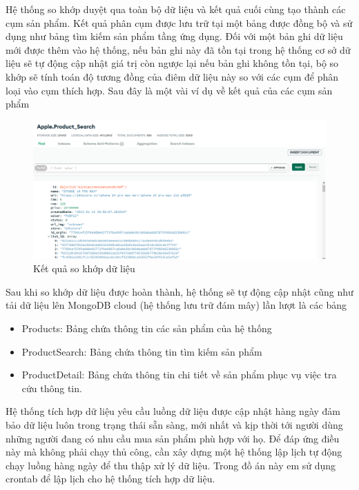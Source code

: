 \documentclass[../DoAn.tex]{subfiles}
\begin{document}
Hệ thống so khớp duyệt qua toàn bộ dữ liệu và kết quả cuối cùng tạo thành các cụm sản phẩm. Kết quả phân cụm được lưu trữ tại một bảng được đồng bộ và sử dụng như bảng tìm kiếm sản phẩm tầng ứng dụng. Đối với một bản ghi dữ liệu mới được thêm vào hệ thống, nếu bản ghi này đã tồn tại trong hệ thống cơ sở dữ liệu sẽ tự động cập nhật giá trị còn ngược lại nếu bản ghi không tồn tại, bộ so khớp sẽ tính toán độ tương đồng của điêm dữ liệu này so với các cụm để phân loại vào cụm thích hợp. Sau đây là một vài ví dụ về kết quả của các cụm sản phẩm

 \begin{figure}[H]
    \centering
    \includegraphics[scale=0.5]{Hinhve/data_matching_res.png}
    \caption{Kết quả so khớp dữ liệu}
    \label{fig:my_label2}
\end{figure}

 Sau khi so khớp dữ liệu được hoàn thành, hệ thống sẽ tự động cập nhật cũng như tải dữ liệu lên MongoDB cloud (hệ thống lưu trữ đám mây) lần lượt là các bảng 
 \begin{itemize}
     \item Products: Bảng chứa thông tin các sản phẩm của hệ thống
     \item ProductSearch: Bảng chứa thông tin tìm kiếm sản phẩm
     \item ProductDetail: Bảng chứa thông tin chi tiết về sản phẩm phục vụ việc tra cứu thông tin.
 \end{itemize}

 

Hệ thống tích hợp dữ liệu yêu cầu luồng dữ liệu được cập nhật hàng ngày đảm bảo dữ liệu luôn trong trạng thái sẵn sàng, mới nhất và kịp thời tới người dùng những người đang có nhu cầu mua sản phẩm phù hợp với họ. Để đáp ứng điều này mà không phải chạy thủ công, cần xây dựng một hệ thống lập lịch tự động chạy luồng hàng ngày để thu thập xử lý dữ liệu. Trong đồ án này em sử dụng crontab để lập lịch cho hệ thống tích hợp dữ liệu.
\end{document}
